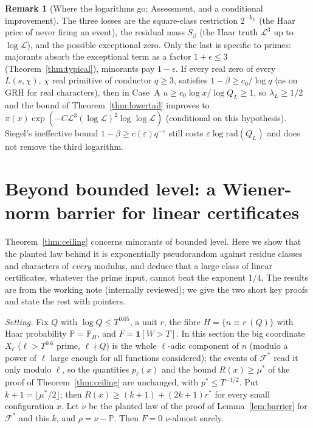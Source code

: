 \documentclass[11pt,reqno]{amsart}
\theoremstyle{definition}
\newtheorem{remark}[theorem]{Remark}
\newcommand{\Lc}{\mathcal L}
\newcommand{\PP}{\mathbb P}
\begin{document}
\begin{remark}[Where the logarithms go; Assessment, and a conditional improvement]\label{rem:tailogs}
The three losses are the square-class restriction $2^{-k_L}$ (the Haar price of
never firing an event), the residual mass $S_\beta$ (the Haar truth $\Lc^3$ up to
$\log\Lc$), and the possible exceptional zero.  Only the last is specific to
primes: majorants absorb the exceptional term as a factor $1+\epsilon\le3$
(Theorem~\ref{thm:typical}), minorants pay $1-\epsilon$.  If every real zero of every
$L(s,\chi)$, $\chi$ real primitive of conductor $q\ge3$, satisfies $1-\beta\ge c_0/\log q$
(as on GRH for real characters), then in Case~A $u\ge c_0\log x/\log Q_L\ge1$, so
$\lambda_L\ge1/2$ and the bound of Theorem~\ref{thm:lowertail} improves to
$\pi(x)\exp(-C\Lc^3(\log\Lc)^2\log\log\Lc)$ (conditional on this hypothesis).
Siegel's ineffective bound $1-\beta\ge c(\varepsilon)q^{-\varepsilon}$ still costs $\varepsilon\log\mathrm{rad}(Q_L)$
and does not remove the third logarithm.
\end{remark}

\section{Beyond bounded level: a Wiener-norm barrier for linear certificates}\label{sec:wiener}

Theorem~\ref{thm:ceiling} concerns minorants of bounded level.  Here we show
that the planted law behind it is exponentially pseudorandom against
residue classes and characters of \emph{every} modulus, and deduce that a
large class of linear certificates, whatever the prime input, cannot
beat the exponent $1/4$.  The results are from the working note \cite{O15}
(internally reviewed); we give the two short key proofs and state the rest
with pointers.

\emph{Setting.}  Fix $Q$ with $\log Q\le T^{0.05}$, a unit $r$, the fibre
$H=\{n\equiv r\ (Q)\}$ with Haar probability $\PP=\PP_H$, and $F=\mathbf 1[W>T]$.  In this
section the big coordinate $X_\ell$ ($\ell>T^{0.6}$ prime, $\ell\nmid Q$) is the whole
$\ell$-adic component of $n$ (modulo a power of $\ell$ large enough for all
functions considered); the events of $\mathcal F^*$ read it only modulo $\ell$, so the
quantities $p_\ell(x)$ and the bound $R(x)\ge\mu^*$ of the proof of
Theorem~\ref{thm:ceiling} are unchanged, with $p^*\le T^{-1/2}$.  Put $k+1=\lfloor\mu^*/2\rfloor$;
then $R(x)\ge(k+1)+(2k+1)r^*$ for every small configuration $x$.  Let $\nu$ be the
planted law of the proof of Lemma~\ref{lem:barrier} for $\mathcal F^*$ and this $k$,
and $\rho=\nu-\PP$.  Then $F=0$ $\nu$-almost surely.
\end{document}
